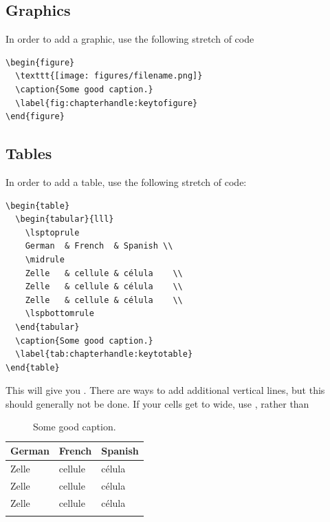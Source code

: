 \subsection{Graphics}
In order to add a graphic, use the following stretch of code

\begin{verbatim}
\begin{figure}
  \texttt{[image: figures/filename.png]}
  \caption{Some good caption.}
  \label{fig:chapterhandle:keytofigure}
\end{figure}
\end{verbatim}

\subsection{Tables}
In order to add a table, use the following stretch of code:

\begin{verbatim}
\begin{table} 
  \begin{tabular}{lll}
    \lsptoprule
    German  & French  & Spanish \\
    \midrule
    Zelle   & cellule & célula    \\
    Zelle   & cellule & célula    \\
    Zelle   & cellule & célula    \\
    \lspbottomrule
  \end{tabular}
  \caption{Some good caption.}
  \label{tab:chapterhandle:keytotable}
\end{table}
\end{verbatim}

This will give you  . There are ways to add additional vertical lines, but this should generally not be done. If your cells get to wide, use , rather than 
\begin{table}[h]
  \begin{tabular}{lll}
    \lsptoprule
    German  & French  & Spanish \\
    \midrule
    Zelle   & cellule & célula    \\
    Zelle   & cellule & célula    \\
    Zelle   & cellule & célula    \\
    \lspbottomrule
  \end{tabular}
  \caption{Some good caption.}
  \label{tab:chapterhandle:keytotable}
\end{table}

